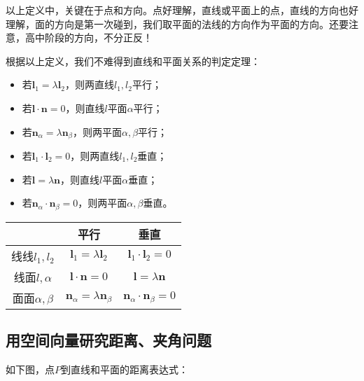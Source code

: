 \begin{tcolorbox}
以上定义中，关键在于点和方向。点好理解，直线或平面上的点，直线的方向也好理解，面的方向是第一次碰到，我们取平面的法线的方向作为平面的方向。还要注意，高中阶段的方向，不分正反！
\end{tcolorbox}

\begin{theorem}
根据以上定义，我们不难得到直线和平面关系的判定定理：
\begin{itemize}
    \item 若$\boldsymbol{l}_1=\lambda \boldsymbol{l}_2$，则两直线$l_1,l_2$平行；
    \item 若$\boldsymbol{l}\cdot \boldsymbol{n}=0$，则直线$l$平面$\alpha $平行；
    \item 若$\boldsymbol{n}_{\alpha}=\lambda \boldsymbol{n}_{\beta}$，则两平面$\alpha ,\beta $平行；
    \item 若$\boldsymbol{l}_1\cdot \boldsymbol{l}_2=0$，则两直线$l_1,l_2$垂直；
    \item 若$\boldsymbol{l}=\lambda \boldsymbol{n}$，则直线$l$平面$\alpha $垂直；
    \item 若$\boldsymbol{n}_{\alpha}\cdot \boldsymbol{n}_{\beta}=0$，则两平面$\alpha ,\beta $垂直。
\end{itemize}
\end{theorem}

\begin{table}[h]
\centering
\begin{tabular}{ccc}
    \toprule
     & 平行 & 垂直\\
    \midrule
    线线$l_1,l_2$ & $\boldsymbol{l}_1=\lambda \boldsymbol{l}_2$ & $\boldsymbol{l}_1\cdot \boldsymbol{l}_2=0$\\
    线面$l,\alpha $ & $\boldsymbol{l}\cdot \boldsymbol{n}=0$ & $\boldsymbol{l}=\lambda \boldsymbol{n}$\\
    面面$\alpha ,\beta $ & $\boldsymbol{n}_{\alpha}=\lambda \boldsymbol{n}_{\beta}$ & $\boldsymbol{n}_{\alpha}\cdot \boldsymbol{n}_{\beta}=0$\\
    \bottomrule
\end{tabular}
\end{table}

\subsection{用空间向量研究距离、夹角问题}

如下图，点$P$到直线和平面的距离表达式：

